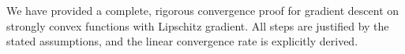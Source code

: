 \documentclass{article}
\begin{document}
We have provided a complete, rigorous convergence proof for gradient descent on strongly convex functions with Lipschitz gradient. All steps are justified by the stated assumptions, and the linear convergence rate is explicitly derived.

\end{document}
